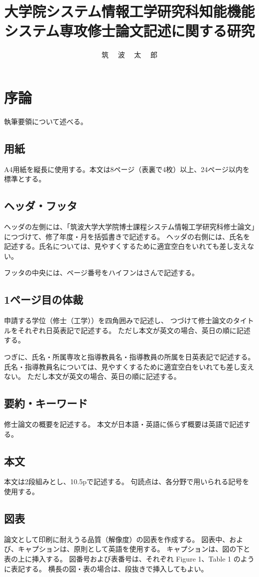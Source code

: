 ﻿\documentclass[11pt,twocolumn]{jarticle} %
\title{大学院システム情報工学研究科知能機能システム専攻修士論文記述に関する研究}
\author{筑 \ \ 波 \ \ 太 \ \ 郎}
\begin{document}
\maketitle
\thispagestyle{iitheader}

\section{序論}
執筆要領について述べる。

\subsection{用紙}
A4用紙を縦長に使用する。本文は8ページ（表裏で4枚）以上、24ページ以内を標準とする。

\subsection{ヘッダ・フッタ}
ヘッダの左側には、「筑波大学大学院博士課程システム情報工学研究科修士論文」につづけて、修了年度・月を括弧書きで記述する。
ヘッダの右側には、氏名を記述する。氏名については、見やすくするために適宜空白をいれても差し支えない。

フッタの中央には、ページ番号をハイフンはさんで記述する。

\subsection{1ページ目の体裁}
申請する学位（修士（工学））を四角囲みで記述し、
つづけて修士論文のタイトルをそれぞれ日英表記で記述する。
ただし本文が英文の場合、英日の順に記述する。

つぎに、氏名・所属専攻と指導教員名・指導教員の所属を日英表記で記述する。
氏名・指導教員名については、見やすくするために適宜空白をいれても差し支えない。
ただし本文が英文の場合、英日の順に記述する。


\subsection{要約・キーワード}
修士論文の概要を記述する。
本文が日本語・英語に係らず概要は英語で記述する。


\subsection{本文}
本文は2段組みとし、10.5pで記述する。
句読点は、各分野で用いられる記号を使用する。

\subsection{図表}
論文として印刷に耐えうる品質（解像度）の図表を作成する。
図表中、および、キャプションは、原則として英語を使用する。
キャプションは、図の下と表の上に挿入する。
図番号および表番号は、それぞれ Figure 1、Table 1 のように表記する。
横長の図・表の場合は、段抜きで挿入してもよい。
\end{document}
